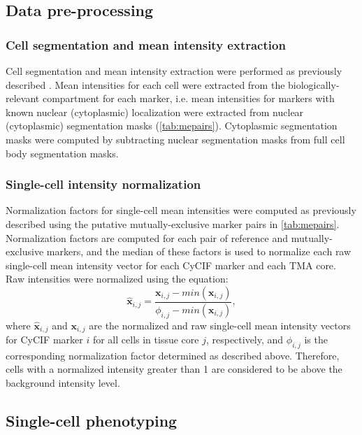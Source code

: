 \documentclass[preprint,review,3p,12pt]{elsarticle}
\begin{document}
\subsection{Data pre-processing}
\subsubsection{Cell segmentation and mean intensity extraction}
Cell segmentation and mean intensity extraction were performed as previously described \cite{cmif2020}. Mean intensities for each cell were extracted from the biologically-relevant compartment for each marker, i.e. mean intensities for markers with known nuclear (cytoplasmic) localization were extracted from nuclear (cytoplasmic) segmentation masks (\autoref{tab:mepairs}). Cytoplasmic segmentation masks were computed by subtracting nuclear segmentation masks from full cell body segmentation masks.

\subsubsection{Single-cell intensity normalization}
Normalization factors for single-cell mean intensities were computed as previously described \cite{Chang2020} using the putative mutually-exclusive marker pairs in \autoref{tab:mepairs}. Normalization factors are computed for each pair of reference and mutually-exclusive markers, and the median of these factors is used to normalize each raw single-cell mean intensity vector for each CyCIF marker and each TMA core. Raw intensities were normalized using the equation:
\begin{equation}
\label{eq:norm}
\hat{\mathbf{x}}_{i,j} = \frac{\mathbf{x}_{i,j}-min(\mathbf{x}_{i,j})}{\phi_{i,j}-min(\mathbf{x}_{i,j})},
\end{equation}
where $\hat{\mathbf{x}}_{i,j}$ and $\mathbf{x}_{i,j}$ are the normalized and raw single-cell mean intensity vectors for CyCIF marker $i$ for all cells in tissue core $j$, respectively, and $\phi_{i,j}$ is the corresponding normalization factor determined as described above. Therefore, cells with a normalized intensity greater than 1 are considered to be above the background intensity level.

\subsection{Single-cell phenotyping}
\end{document}
